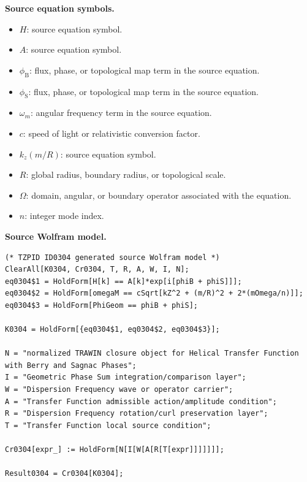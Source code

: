 \begin{minipage}[t]{0.49\linewidth}
\begingroup
\small
\raggedright
\textbf{Source equation symbols.}\par
\begin{itemize}[leftmargin=1.35em,itemsep=1pt,topsep=1pt,parsep=0pt]
    \item $H$: source equation symbol.
    \item $A$: source equation symbol.
    \item $\phi_{\mathrm{B}}$: flux, phase, or topological map term in the source equation.
    \item $\phi_{\mathrm{S}}$: flux, phase, or topological map term in the source equation.
    \item $\omega_m$: angular frequency term in the source equation.
    \item $c$: speed of light or relativistic conversion factor.
    \item $k_z(m/R)$: source equation symbol.
    \item $R$: global radius, boundary radius, or topological scale.
    \item $\Omega$: domain, angular, or boundary operator associated with the equation.
    \item $n$: integer mode index.
\end{itemize}
\endgroup
\end{minipage}\hfill
\begin{minipage}[t]{0.47\linewidth}
\begingroup
\scriptsize
\raggedright
\textbf{Source Wolfram model.}\par
\begin{Verbatim}[fontsize=\tiny,breaklines=true,breakanywhere=true]
(* TZPID ID0304 generated source Wolfram model *)
ClearAll[K0304, Cr0304, T, R, A, W, I, N];
eq0304$1 = HoldForm[H[k] == A[k]*exp[i[phiB + phiS]]];
eq0304$2 = HoldForm[omegaM == cSqrt[kZ^2 + (m/R)^2 + 2*(mOmega/n)]];
eq0304$3 = HoldForm[PhiGeom == phiB + phiS];

K0304 = HoldForm[{eq0304$1, eq0304$2, eq0304$3}];

N = "normalized TRAWIN closure object for Helical Transfer Function with Berry and Sagnac Phases";
I = "Geometric Phase Sum integration/comparison layer";
W = "Dispersion Frequency wave or operator carrier";
A = "Transfer Function admissible action/amplitude condition";
R = "Dispersion Frequency rotation/curl preservation layer";
T = "Transfer Function local source condition";

Cr0304[expr_] := HoldForm[N[I[W[A[R[T[expr]]]]]]];

Result0304 = Cr0304[K0304];
\end{Verbatim}
\endgroup
\end{minipage}


